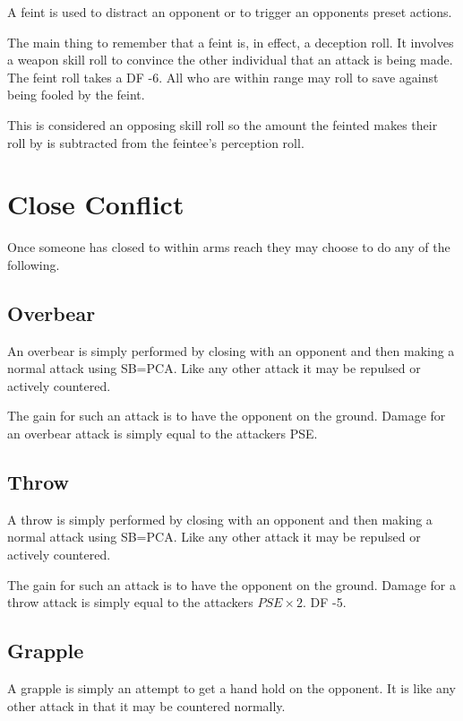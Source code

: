 A feint is used to distract an opponent or to trigger an opponents
preset actions.

The main thing to remember that a feint is, in effect, a deception
roll. It involves a weapon skill roll to convince the other
individual that an attack is being made. The feint roll takes a DF
-6. All who are within range may roll to save against
being fooled by the feint.

This is considered an opposing skill roll so the amount the feinted makes
their roll by is subtracted from the feintee's perception roll.

\section{Close Conflict}

Once someone has closed to within arms reach they may choose to do
any of the following.

\subsection{Overbear}

An overbear is simply performed by closing with an opponent and then
making a normal attack using SB=PCA. Like any other attack it may be
repulsed or actively countered.

The gain for such an attack is to have the opponent on the ground.
Damage for an overbear attack is simply equal to the attackers PSE.

\subsection{Throw}

A throw is simply performed by closing with an opponent and then
making a normal attack using SB=PCA. Like any other attack it may be
repulsed or actively countered.

The gain for such an attack is to have the opponent on the ground.
Damage for a throw attack is simply equal to the attackers \( PSE \times 2\).
DF -5.

\subsection{Grapple}

A grapple is simply an attempt to get a hand hold on the opponent.
It is like any other attack in that it may be countered normally.

